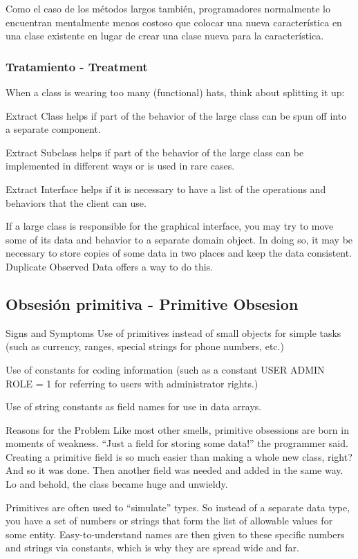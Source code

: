\documentclass[11pt,a4paper,oneside]{book}
\begin{document}
Como el caso de los métodos largos también, programadores normalmente lo encuentran mentalmente menos costoso que colocar una nueva característica en una clase existente en lugar de crear una clase nueva para la característica. 

\subsubsection{Tratamiento - Treatment}


When a class is wearing too many (functional) hats, think about splitting it up:


Extract Class helps if part of the behavior of the large class can be spun off into a separate component.

Extract Subclass helps if part of the behavior of the large class can be implemented in different ways or is used in rare cases.

Extract Interface helps if it is necessary to have a list of the operations and behaviors that the client can use.

If a large class is responsible for the graphical interface, you may try to move some of its data and behavior to a separate domain object. In doing so, it may be necessary to store copies of some data in two places and keep the data consistent. Duplicate Observed Data offers a way to do this.


\subsection{Obsesión primitiva - Primitive Obsesion}
\label{primitiveobsesion}
Signs and Symptoms
Use of primitives instead of small objects for simple tasks (such as currency, ranges, special strings for phone numbers, etc.)

Use of constants for coding information (such as a constant USER ADMIN ROLE = 1 for referring to users with administrator rights.)

Use of string constants as field names for use in data arrays.


Reasons for the Problem
Like most other smells, primitive obsessions are born in moments of weakness. “Just a field for storing some data!” the programmer said. Creating a primitive field is so much easier than making a whole new class, right? And so it was done. Then another field was needed and added in the same way. Lo and behold, the class became huge and unwieldy.

Primitives are often used to “simulate” types. So instead of a separate data type, you have a set of numbers or strings that form the list of allowable values for some entity. Easy-to-understand names are then given to these specific numbers and strings via constants, which is why they are spread wide and far.
\end{document}
